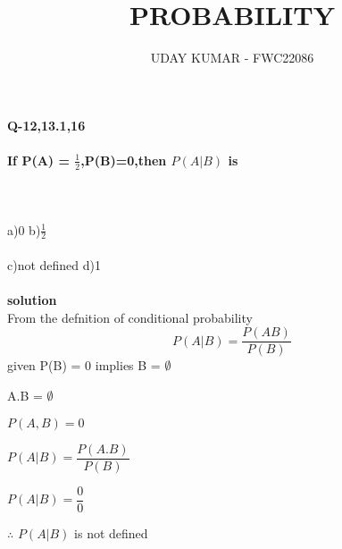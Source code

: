 \documentclass{article}
\begin{document}
\title{PROBABILITY}
\author{\Large UDAY KUMAR - FWC22086}
\date{}

\maketitle
\paragraph*{\large Q-12,13.1,16}
\paragraph*{\large If P(A) = $\frac{1}{2}$,P(B)=0,then \textbf{$P(A|B)$} is }
\hspace{15mm}\\
\\
a)0 \hspace{50mm} b)$\frac{1}{2}$
\\
\\
c)not defined \hspace{36mm} d)1\\
\\
\textbf{solution}\\
From the defnition of conditional probability\\
\begin{equation}
P(A|B) = \dfrac{P(AB)}{P(B)}
\end{equation}
given P(B) = 0 implies  B = $\emptyset$ 
\begin{center}
A.B = $\emptyset$
\end{center}
\begin{center}
$P(A,B) =0$ 
\end{center}
\begin{center}
$P(A|B) = \dfrac{P(A.B)}{P(B)}$
\end{center}
\begin{center}
$P(A|B) = \dfrac{0}{0}$
\end{center}
\begin{center}
$\therefore$ $P(A|B)$ is not defined
\end{center}
\end{document}
